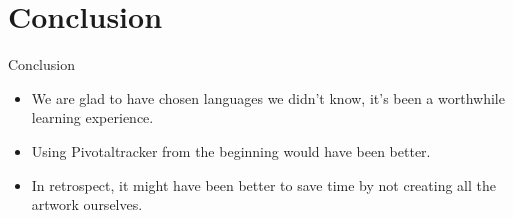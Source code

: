 \documentclass{beamer}
\begin{document}
\section{Conclusion}

\begin{frame}{Conclusion}
  \begin{itemize}
    \item We are glad to have chosen languages we didn't know, it's been a worthwhile learning experience.
    \item Using Pivotaltracker from the beginning would have been better.
    \item In retrospect, it might have been better to save time by not creating all the artwork ourselves.
  \end{itemize}
\end{frame}
\end{document}
